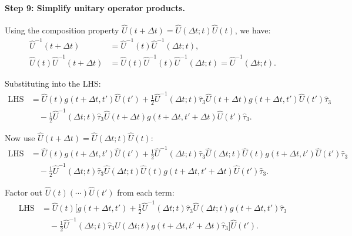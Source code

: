 \documentclass[11pt]{article}
\begin{document}
\paragraph{Step 9: Simplify unitary operator products.}

Using the composition property $\hat{U}(t+\Delta t) = \hat{U}(\Delta t; t) \hat{U}(t)$, we have:
\begin{align}
\hat{U}^{-1}(t+\Delta t) &= \hat{U}^{-1}(t) \hat{U}^{-1}(\Delta t; t), \\
\hat{U}(t) \hat{U}^{-1}(t+\Delta t) &= \hat{U}(t) \hat{U}^{-1}(t) \hat{U}^{-1}(\Delta t; t) = \hat{U}^{-1}(\Delta t; t).
\end{align}

Substituting into the LHS:
\begin{equation}
\begin{split}
\text{LHS} &= \hat{U}(t) g(t+\Delta t, t') \hat{U}(t') + \frac{1}{2} \hat{U}^{-1}(\Delta t; t) \hat{\tau}_3 \hat{U}(t+\Delta t) g(t+\Delta t, t') \hat{U}(t') \hat{\tau}_3 \\
&\quad - \frac{1}{2} \hat{U}^{-1}(\Delta t; t) \hat{\tau}_3 \hat{U}(t+\Delta t) g(t+\Delta t, t'+\Delta t) \hat{U}(t') \hat{\tau}_3.
\end{split}
\end{equation}

Now use $\hat{U}(t+\Delta t) = \hat{U}(\Delta t; t) \hat{U}(t)$:
\begin{equation}
\begin{split}
\text{LHS} &= \hat{U}(t) g(t+\Delta t, t') \hat{U}(t') + \frac{1}{2} \hat{U}^{-1}(\Delta t; t) \hat{\tau}_3 \hat{U}(\Delta t; t) \hat{U}(t) g(t+\Delta t, t') \hat{U}(t') \hat{\tau}_3 \\
&\quad - \frac{1}{2} \hat{U}^{-1}(\Delta t; t) \hat{\tau}_3 \hat{U}(\Delta t; t) \hat{U}(t) g(t+\Delta t, t'+\Delta t) \hat{U}(t') \hat{\tau}_3.
\end{split}
\end{equation}

Factor out $\hat{U}(t) (\cdots) \hat{U}(t')$ from each term:
\begin{equation}
\begin{split}
\text{LHS} &= \hat{U}(t) \Bigg[g(t+\Delta t, t') + \frac{1}{2} \hat{U}^{-1}(\Delta t; t) \hat{\tau}_3 \hat{U}(\Delta t; t) g(t+\Delta t, t') \hat{\tau}_3 \\
&\quad - \frac{1}{2} \hat{U}^{-1}(\Delta t; t) \hat{\tau}_3 \hat{U}(\Delta t; t) g(t+\Delta t, t'+\Delta t) \hat{\tau}_3 \Bigg] \hat{U}(t').
\end{split}
\end{equation}
\end{document}

